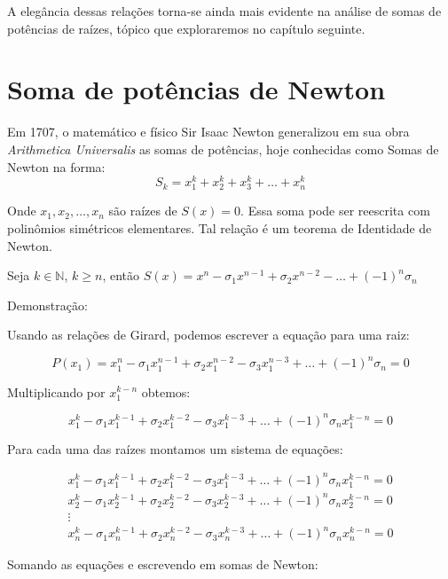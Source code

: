 A elegância dessas relações torna-se ainda mais evidente na análise de somas de potências de raízes, tópico que exploraremos no capítulo seguinte.

\chapter{Soma de potências de Newton}

Em 1707, o matemático e físico Sir Isaac Newton generalizou em sua obra \textit{Arithmetica Universalis} as somas de potências, hoje conhecidas como Somas de Newton na forma:
\begin{equation}
	S_{k} = x_{1}^{k} + x_{2}^{k} + x_{3}^{k} + \dots + x_{n}^{k}
\end{equation}

Onde $x_{1}, x_{2}, \dots, x_{n}$ são raízes de $S(x)=0$. Essa soma pode ser reescrita com polinômios simétricos elementares. Tal relação é um teorema de Identidade de Newton.

Seja $k \in \mathbb{N}$, $k \ge n$, então $S(x) = x^{n} - \sigma_{1}x^{n-1} + \sigma_{2}x^{n-2} - \dots + (-1)^{n}\sigma_{n}$

Demonstração:

Usando as relações de Girard, podemos escrever a equação para uma raiz:

$$P(x_{1}) = x_{1}^{n} - \sigma_{1}x_{1}^{n-1} + \sigma_{2}x_{1}^{n-2} - \sigma_{3}x_{1}^{n-3} + \dots + (-1)^{n}\sigma_{n} = 0$$

Multiplicando por $x_{1}^{k-n}$ obtemos:

$$x_{1}^{k} - \sigma_{1}x_{1}^{k-1} + \sigma_{2}x_{1}^{k-2} - \sigma_{3}x_{1}^{k-3} + \dots + (-1)^{n}\sigma_{n}x_{1}^{k-n} = 0$$

Para cada uma das raízes montamos um sistema de equações:

\begin{gather*}
    x_{1}^{k} - \sigma_{1}x_{1}^{k-1} + \sigma_{2}x_{1}^{k-2} - \sigma_{3}x_{1}^{k-3} + \dots + (-1)^{n}\sigma_{n}x_{1}^{k-n} = 0 \\
    x_{2}^{k} - \sigma_{1}x_{2}^{k-1} + \sigma_{2}x_{2}^{k-2} - \sigma_{3}x_{2}^{k-3} + \dots + (-1)^{n}\sigma_{n}x_{2}^{k-n} = 0 \\
    \vdots \\
    x_{n}^{k} - \sigma_{1}x_{n}^{k-1} + \sigma_{2}x_{n}^{k-2} - \sigma_{3}x_{n}^{k-3} + \dots + (-1)^{n}\sigma_{n}x_{n}^{k-n} = 0
\end{gather*}

Somando as equações e escrevendo em somas de Newton:

